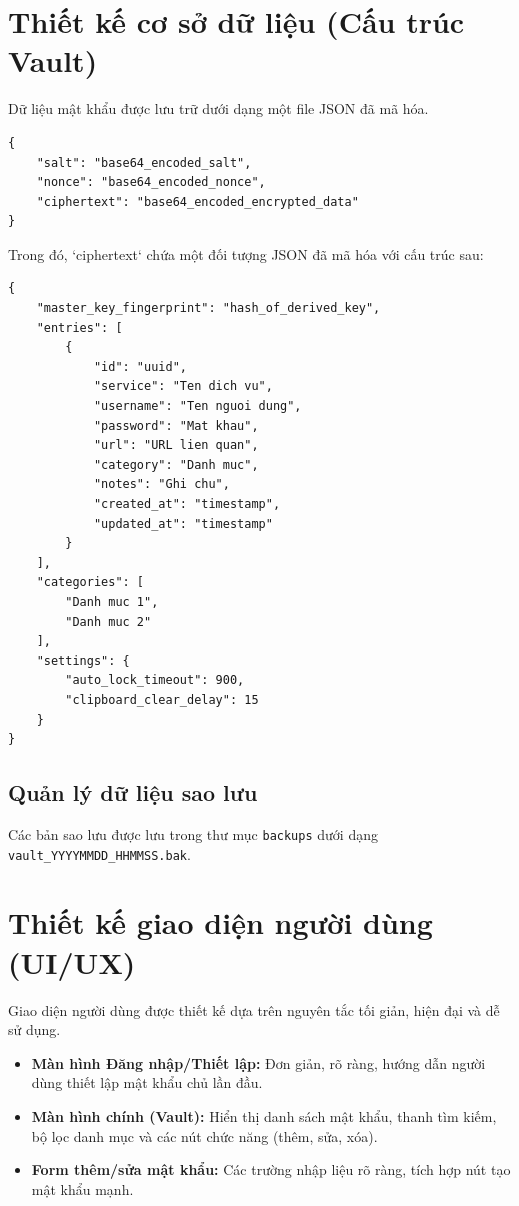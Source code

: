 \section{Thiết kế cơ sở dữ liệu (Cấu trúc Vault)}
Dữ liệu mật khẩu được lưu trữ dưới dạng một file JSON đã mã hóa.
\begin{lstlisting}[caption=Cấu trúc dữ liệu vault mã hóa]
{
    "salt": "base64_encoded_salt",
    "nonce": "base64_encoded_nonce",
    "ciphertext": "base64_encoded_encrypted_data"
}
\end{lstlisting}
Trong đó, `ciphertext` chứa một đối tượng JSON đã mã hóa với cấu trúc sau:
\begin{lstlisting}[caption=Cấu trúc dữ liệu nội dung vault (chưa mã hóa)]
{
    "master_key_fingerprint": "hash_of_derived_key",
    "entries": [
        {
            "id": "uuid",
            "service": "Ten dich vu",
            "username": "Ten nguoi dung",
            "password": "Mat khau",
            "url": "URL lien quan",
            "category": "Danh muc",
            "notes": "Ghi chu",
            "created_at": "timestamp",
            "updated_at": "timestamp"
        }
    ],
    "categories": [
        "Danh muc 1",
        "Danh muc 2"
    ],
    "settings": {
        "auto_lock_timeout": 900,
        "clipboard_clear_delay": 15
    }
}
\end{lstlisting}
\subsection{Quản lý dữ liệu sao lưu}
Các bản sao lưu được lưu trong thư mục \texttt{backups} dưới dạng \texttt{vault\_YYYYMMDD\_HHMMSS.bak}.

\section{Thiết kế giao diện người dùng (UI/UX)}
Giao diện người dùng được thiết kế dựa trên nguyên tắc tối giản, hiện đại và dễ sử dụng.
\begin{itemize}
    \item \textbf{Màn hình Đăng nhập/Thiết lập:} Đơn giản, rõ ràng, hướng dẫn người dùng thiết lập mật khẩu chủ lần đầu.
    \item \textbf{Màn hình chính (Vault):} Hiển thị danh sách mật khẩu, thanh tìm kiếm, bộ lọc danh mục và các nút chức năng (thêm, sửa, xóa).
    \item \textbf{Form thêm/sửa mật khẩu:} Các trường nhập liệu rõ ràng, tích hợp nút tạo mật khẩu mạnh.
\end{itemize}

